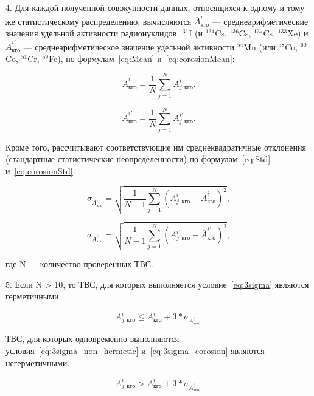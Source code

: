 4. Для каждой полученной совокупности данных, относящихся к одному
и тому же статистическому распределению, вычисляются $\overline{A}_{кго}^{i}$ --- среднеарифметические значения удельной активности радионуклидов $^{131}$I (и $^{134}$Cs, $^{136}$Cs, $^{137}$Cs, $^{133}$Xe) и $\overline{A}_{кго}^{i'}$ --- среднеарифметическое значение удельной активности $^{54}$Mn (или $^{58}$Co, $^{60}$Co, $^{51}$Cr, $^{59}$Fe), по формулам~\ref{eq:Mean} и~\ref{eq:corosionMean}:

\begin{equation} \label{eq:Mean}
	\overline{A}_{кго}^{i} = \frac{1}{N}\sum_{j=1}^{N}A_{j,кго}^{i}.
\end{equation}

\begin{equation} \label{eq:corosionMean}
	\overline{A}_{кго}^{i'} = \frac{1}{N}\sum_{j=1}^{N}A_{j,кго}^{i'}.
\end{equation}

Кроме того, рассчитывают соответствующие им среднеквадратичные
отклонения (стандартные статистические неопределенности) по формулам~\ref{eq:Std} и~\ref{eq:corosionStd}:

\begin{equation} \label{eq:Std}
	\sigma_{{A}_{кго}^{i}} = \sqrt{\frac{1}{N-1}\sum_{j=1}^{N}(A_{j,кго}^{i} - \overline{A}_{кго}^{i})^2},
\end{equation}
	
\begin{equation} \label{eq:corosionStd}
	\sigma_{{A}_{кго}^{i'}} = \sqrt{\frac{1}{N-1}\sum_{j=1}^{N}(A_{j,кго}^{i'} - \overline{A}_{кго}^{i'})^2},
\end{equation}

где N --- количество проверенных ТВС.

5. Если N > 10, то ТВС, для которых выполняется условие~\ref{eq:3sigma} являются герметичными.

\begin{equation} \label{eq:3sigma}
	A_{j,кго}^{i} \leq {A}_{кго}^{i} + 3*\sigma_{{A}_{кго}^{i}}.
\end{equation}

ТВС, для которых одновременно выполняются условия~\ref{eq:3sigma_non_hermetic} и~\ref{eq:3sigma_corosion} являются негерметичными.

\begin{equation} \label{eq:3sigma_non_hermetic}
	A_{j,кго}^{i} > {A}_{кго}^{i} + 3*\sigma_{{A}_{кго}^{i}}.
\end{equation}

